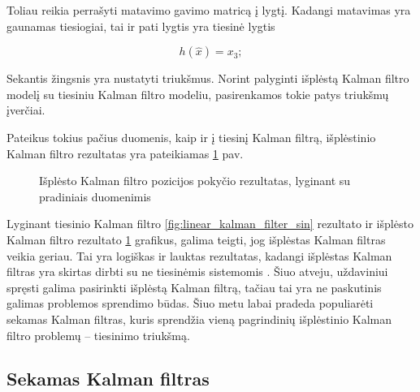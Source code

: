 Toliau reikia perrašyti matavimo gavimo matricą į lygtį.
Kadangi matavimas yra gaunamas tiesiogiai, tai ir pati lygtis yra tiesinė lygtis

\begin{equation}
    h(\hat{x}) = x_3;
\end{equation}

Sekantis žingsnis yra nustatyti triukšmus.
Norint palyginti išplėstą Kalman filtro modelį su tiesiniu Kalman filtro modeliu, pasirenkamos tokie patys triukšmų įverčiai.

Pateikus tokius pačius duomenis, kaip ir į tiesinį Kalman filtrą, išplėstinio Kalman filtro rezultatas yra pateikiamas \ref{fig:extended_kalman_filter_sin} pav.

\begin{figure}
    \centering
    \caption{Išplėsto Kalman filtro pozicijos pokyčio rezultatas, lyginant su pradiniais duomenimis}
    \label{fig:extended_kalman_filter_sin}
\end{figure}

Lyginant tiesinio Kalman filtro \ref{fig:linear_kalman_filter_sin} rezultato ir išplėsto Kalman filtro rezultato \ref{fig:extended_kalman_filter_sin} grafikus, galima teigti, jog išplėstas Kalman filtras veikia geriau.
Tai yra logiškas ir lauktas rezultatas, kadangi išplėstas Kalman filtras yra skirtas dirbti su ne tiesinėmis sistemomis \cite{6851407}.
Šiuo atveju, uždaviniui spręsti galima pasirinkti išplėstą Kalman filtrą, tačiau tai yra ne paskutinis galimas problemos sprendimo būdas.
Šiuo metu labai pradeda populiarėti sekamas Kalman filtras, kuris sprendžia vieną pagrindinių išplėstinio Kalman filtro problemų -- tiesinimo triukšmą.

\subsection{Sekamas Kalman filtras}

